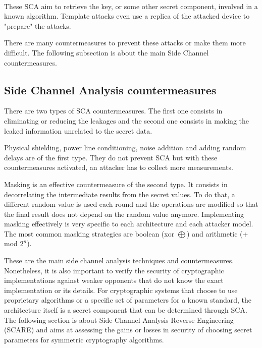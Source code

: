 \documentclass[11pt]{sdm}
\begin{document}
\paragraph{}
These SCA aim to retrieve the key, or some other secret component, involved in a known algorithm.
Template attacks even use a replica of the attacked device to "prepare" the attacks.

There are many countermeasures to prevent these attacks or make them more difficult.
The following subsection is about the main Side Channel countermeasures.

\subsection{Side Channel Analysis countermeasures}

There are two types of SCA countermeasures. 
The first one consists in eliminating or reducing the leakages and the second one consists in making the leaked information unrelated to the secret data.

Physical shielding, power line conditioning, noise addition and adding random delays are of the first type.
They do not prevent SCA but with these countermeasures activated, an attacker has to collect more measurements.

Masking is an effective countermeasure of the second type.
It consists in decorrelating the intermediate results from the secret values.
To do that, a different random value is used each round and the operations are modified so that the final result does not depend on the random value anymore.
Implementing masking effectively is very specific to each architecture and each attacker model.
The most common masking strategies are boolean (xor $\bigoplus$) and arithmetic (+ mod $2^n$). %





These are the main side channel analysis techniques and countermeasures. 
Nonetheless, it is also important to verify the security of cryptographic implementations against weaker opponents that do not know the exact implementation or its details.
For cryptographic systems that choose to use proprietary algorithms or a specific set of parameters for a known standard, the architecture itself is a secret component that can be determined through SCA.
The following section is about Side Channel Analysis Reverse Engineering (SCARE) and aims at assessing the gains or losses in security of choosing secret parameters for symmetric cryptography algorithms.
\end{document}
